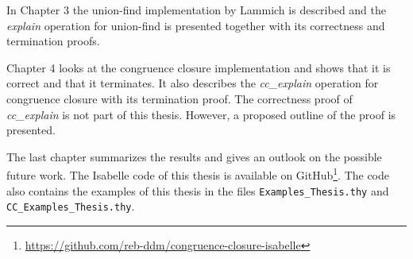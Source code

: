 In Chapter 3 the union-find implementation by Lammich \cite{unionfind-isabelle} is described and the \emph{explain} operation for union-find is presented together with its correctness and termination proofs.

Chapter 4 looks at the congruence closure implementation and shows that it is correct and that it terminates. It also describes the \emph{cc\_explain} operation for congruence closure with its termination proof. The correctness proof of \emph{cc\_explain} is not part of this thesis. However, a proposed outline of the proof is presented.

The last chapter summarizes the results and gives an outlook on the possible future work.
The Isabelle code of this thesis is available on GitHub\footnote{\url{https://github.com/reb-ddm/congruence-closure-isabelle}}.
The code also contains the examples of this thesis in the files \lstinline|Examples_Thesis.thy| and \lstinline|CC_Examples_Thesis.thy|.

